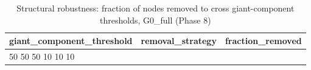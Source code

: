 \begin{table}
\caption{Structural robustness: fraction of nodes removed to cross giant-component thresholds, G0\_full (Phase 8)}
\label{tab:t11_robustness_results}
\begin{tabular}{llr}
\toprule
giant_component_threshold & removal_strategy & fraction_removed \\
\midrule
50%
50%
50%
10%
10%
10%
\bottomrule
\end{tabular}
\end{table}
